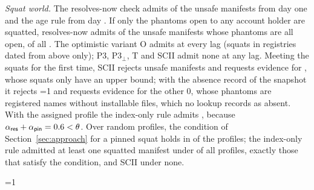 \documentclass[conference]{IEEEtran}
\providecommand{\rHasReplay}{0}\providecommand{\rHasEspBuild}{0}\providecommand{\rRpNetns}{0}\providecommand{\rValByResponse}{0}\providecommand{\rNoPinBelowTheta}{0}\providecommand{\rHasLock}{0}\providecommand{\rHasAudit}{0}\providecommand{\rHasFamEq}{0}\providecommand{\rMainLock}{0}\providecommand{\rRpLockExec}{0}\providecommand{\rMaxAnsCut}{0}\providecommand{\rReqOnlyUrlPio}{0}\providecommand{\rReqPioSpan}{0}\providecommand{\rHistAfterPThreeUAdmit}{0}\providecommand{\rNGgufIsHorizon}{0}\providecommand{\rRemovedModel}{?}\providecommand{\rRemovedAnswers}{?}\providecommand{\rSqAbsRestOwned}{0}\providecommand{\rSqAbsRest}{0}\providecommand{\rNRemovedModels}{0}\providecommand{\rPostHorizonShiftSame}{0}
\newcommand{\sres}{\mathsf{res}}
\newcommand{\spin}{\mathsf{pin}}
\newcommand{\dec}[1]{\textsc{#1}}
\begin{document}
\emph{Squat world.} The resolves-now check admits \rSqExistsZero{} of the unsafe manifests from day one and the age rule
\rSqAgeMonth{} from day \rAgeDays. If only the phantoms open to any account holder are squatted, resolves-now admits
\rSqOpenExistsZeroK{} of the \rNManUOpen{} unsafe manifests whose phantoms are all open, \rSqOpenExistsZero{} of all
\rNManU. The optimistic variant O admits \rSqOptimisticYear{} at every lag
(squats in registries dated from above only); P3, P3$_\bot$, T and SCII admit none at any lag. Meeting the
squats for the first time, SCII rejects \rSqFirstReject{} unsafe manifests and requests evidence for
\rSqFirstRequest{}, whose squats only have an upper bound; with the absence record of the snapshot it rejects
\rSqAbsReject\ifnum\rSqAbsRestOwned=1{} and requests evidence for the other \rSqAbsRest, whose phantoms are registered
names without installable files, which no lookup records as absent\fi. With the assigned profile the index-only rule admits \rSqNovetoYear{}, because
$\alpha_{\sres}+\alpha_{\spin}=\rResPin<\theta$. Over \rSweepN{} random profiles, the condition of
Section~\ref{sec:approach} for a pinned squat holds in \rSweepCondPinned{} of the profiles; the index-only rule
admitted at least one squatted manifest under \rSweepNovetoAny{} of all profiles\ifnum{}, exactly those
that satisfy the condition\fi, and SCII under none.

\begin{table}[t]
\centering
\caption{Gate decisions. Observed world (\ifnum\rMainLock=1 pins from the lock files the tools wrote\else pins
where the ecosystem locks digests\fi): A = \dec{admit},
? = \dec{review} or \dec{request}, X = \dec{reject}, for unsafe ($U$), post-horizon ($H$) and clean ($C$) manifests;
for clean manifests R = \dec{review} and Q = \dec{request}.
Squat world: unsafe manifests admitted when the gate runs $L$ days after every phantom was squatted, and on the first
day when only open names were squatted.}
\label{tab:gate}
\footnotesize
\setlength{\tabcolsep}{4pt}

\end{table}

\ifnum\rHasReplay=1
\end{document}
